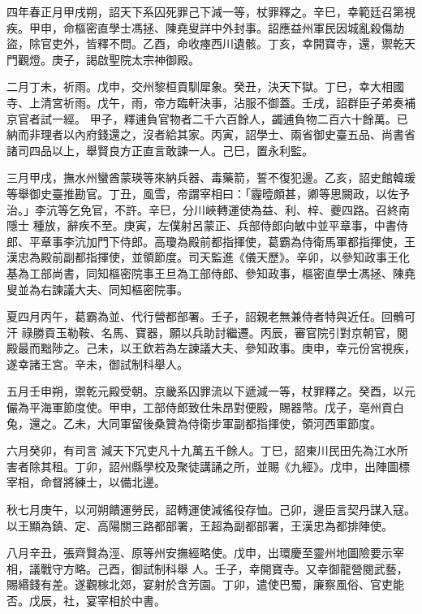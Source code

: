 \begin{pinyinscope}
 四年春正月甲戌朔，詔天下系囚死罪己下減一等，杖罪釋之。辛巳，幸範廷召第視疾。甲申，命樞密直學士馮拯、陳堯叟詳中外封事。詔應益州軍民因城亂殺傷劫盜，除官吏外，皆釋不問。乙酉，命收瘞西川遺骸。丁亥，幸開寶寺，還，禦乾天門觀燈。庚子，謁啟聖院太宗神御殿。



 二月丁未，祈雨。戊申，交州黎桓貢馴犀象。癸丑，決天下獄。丁巳，幸大相國寺、上清宮祈雨。戊午，雨，帝方臨軒決事，沾服不御蓋。壬戌，詔群臣子弟奏補京官者試一經。
 甲子，釋逋負官物者二千六百餘人，蠲逋負物二百六十餘萬。已納而非理者以內府錢還之，沒者給其家。丙寅，詔學士、兩省御史臺五品、尚書省諸司四品以上，舉賢良方正直言敢諫一人。己巳，置永利監。



 三月甲戌，撫水州蠻酋蒙瑛等來納兵器、毒藥箭，誓不復犯邊。乙亥，詔史館韓瑗等舉御史臺推勘官。丁丑，風雪，帝謂宰相曰：「霾曀頗甚，卿等思闕政，以佐予治。」李沆等乞免官，不許。辛巳，分川峽轉運使為益、利、梓、夔四路。召終南隱士
 種放，辭疾不至。庚寅，左僕射呂蒙正、兵部侍郎向敏中並平章事，中書侍郎、平章事李沆加門下侍郎。高瓊為殿前都指揮使，葛霸為侍衛馬軍都指揮使，王漢忠為殿前副都指揮使，並領節度。司天監進《儀天歷》。辛卯，以參知政事王化基為工部尚書，同知樞密院事王旦為工部侍郎、參知政事，樞密直學士馮拯、陳堯叟並為右諫議大夫、同知樞密院事。



 夏四月丙午，葛霸為並、代行營都部署。壬子，詔親老無兼侍者特與近任。回鶻可汗
 祿勝貢玉勒鞍、名馬、寶器，願以兵助討繼遷。丙辰，審官院引對京朝官，閱殿最而黜陟之。己未，以王欽若為左諫議大夫、參知政事。庚申，幸元份宮視疾，遂幸諸王宮。辛未，御試制科舉人。



 五月壬申朔，禦乾元殿受朝。京畿系囚罪流以下遞減一等，杖罪釋之。癸酉，以元儼為平海軍節度使。甲申，工部侍郎致仕朱昂對便殿，賜器幣。戊子，亳州貢白兔，還之。乙未，大同軍留後桑贊為侍衛步軍副都指揮使，領河西軍節度。



 六月癸卯，有司言
 減天下冗吏凡十九萬五千餘人。丁巳，詔東川民田先為江水所害者除其租。丁卯，詔州縣學校及聚徒講誦之所，並賜《九經》。戊申，出陣圖標宰相，命督將練士，以備北邊。



 秋七月庚午，以河朔饋運勞民，詔轉運使減徭役存恤。己卯，邊臣言契丹謀入寇。以王顯為鎮、定、高陽關三路都部署，王超為副都部署，王漢忠為都排陣使。



 八月辛丑，張齊賢為涇、原等州安撫經略使。戊申，出環慶至靈州地圖險要示宰相，議戰守方略。己酉，御試制科舉
 人。壬子，幸開寶寺。又幸御龍營閱武藝，賜緡錢有差。遂觀稼北郊，宴射於含芳園。丁卯，遣使巴蜀，廉察風俗、官吏能否。戊辰，社，宴宰相於中書。




\end{pinyinscope}
